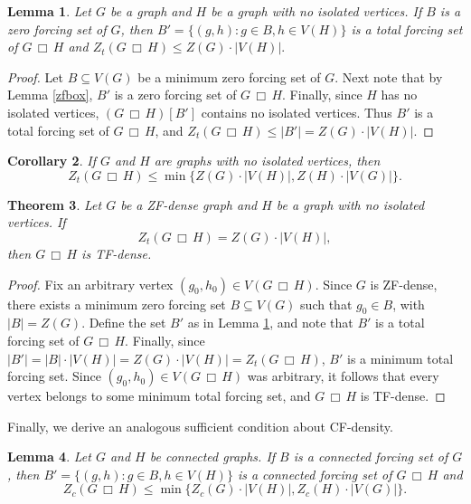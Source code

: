 \documentclass[11pt]{article}
\newtheorem{thm}{Theorem}
\newtheorem{lem}[thm]{Lemma}
\newtheorem{cor}[thm]{Corollary}
\theoremstyle{definition}
\newcommand{\cprod}{\,\Box\,}
\newcommand{\1}{\vspace{0.1cm}}
\newcommand{\2}{\vspace{0.2cm}}
\newcommand{\3}{\vspace{0.3cm}}
\begin{document}
\begin{lem}\label{l:cart_t}
Let $G$ be a graph and $H$ be a graph with no isolated vertices.  If $B$ is a zero forcing set of $G$, then $B'=\{(g,h):g \in B, h \in V(H)\}$ is a total forcing set of $G \cprod H$ and $Z_t(G \cprod  H) \leq Z(G)\cdot|V(H)|.$
\end{lem}

\begin{proof}
Let $B \subseteq V(G)$ be a minimum zero forcing set of $G$.  Next note that by Lemma \ref{zfbox}, $B'$ is a zero forcing set of $G \cprod H$.  Finally, since $H$ has no isolated vertices, $(G \cprod H)[B']$ contains no isolated vertices.  Thus $B'$ is a total forcing set of $G \cprod H$, and $Z_t(G \cprod  H) \leq |B'|=Z(G)\cdot |V(H)|$.
\end{proof}

\begin{cor}
If $G$ and $H$ are graphs with no isolated vertices, then
\[Z_t(G \cprod H) \leq \min\{Z(G) \cdot |V(H)|, Z(H) \cdot |V(G)|\}.\]
\end{cor}

\begin{thm}\label{t:cart_t}
Let $ G $ be a ZF-dense graph and $ H $ be a graph with no isolated vertices. If
\[
Z_t(G \cprod H) = Z(G) \cdot |V(H)|,
\]
then $ G \cprod H $ is TF-dense.
\end{thm}

\begin{proof}
Fix an arbitrary vertex $ (g_0, h_0) \in V(G \cprod H) $. Since $ G $ is ZF-dense, there exists a minimum zero forcing set $ B \subseteq V(G) $ such that $ g_0 \in B $, with $ |B| = Z(G) $. 
 Define the set $B'$ as in Lemma \ref{l:cart_t}, and note that $B'$ is a total forcing set of $G \cprod H$. 
 Finally, since $ |B'| = |B| \cdot |V(H)| = Z(G) \cdot |V(H)| = Z_t(G \cprod H) $, $ B' $ is a minimum total forcing set. Since $ (g_0, h_0) \in V(G \cprod H) $ was arbitrary, it follows that every vertex belongs to some minimum total forcing set, and $ G \cprod H $ is TF-dense.
\end{proof}

Finally, we derive an analogous sufficient condition about CF-density.

\begin{lem}\label{l:cart_c}
Let $G$ and $H$ be connected graphs.  If $B$ is a connected forcing set of $G$, then $B'=\{(g,h):g \in B, h \in V(H)\}$ is a connected forcing set of $G \cprod H$ and
\[Z_c(G \cprod  H) \leq \min\{Z_c(G)\cdot|V(H)|, Z_c(H)\cdot|V(G)|\}.\]
\end{lem}
\end{document}
